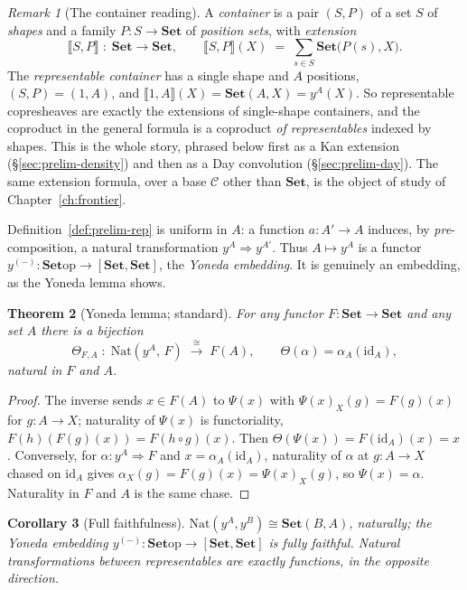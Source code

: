 \documentclass[11pt]{report}
\theoremstyle{plain}
\newtheorem{theorem}{Theorem}[chapter]
\newtheorem{corollary}[theorem]{Corollary}
\theoremstyle{definition}
\theoremstyle{remark}
\newtheorem{remark}[theorem]{Remark}
\newcommand{\Nat}{\mathrm{Nat}}
\newcommand{\op}{\mathrm{op}}
\newcommand{\Set}{\mathbf{Set}}
\newcommand{\den}[1]{\llbracket #1 \rrbracket}
\newcommand{\yA}{y^{A}}
\newcommand{\yy}{y^{(-)}}
\newcommand{\id}{\mathrm{id}}
\newcommand{\iso}{\cong}
\begin{document}
\begin{remark}[The container reading]
\label{rem:prelim-containerrep}
A \emph{container} is a pair $(S,P)$ of a set $S$ of \emph{shapes} and a family
$P\colon S\to\Set$ of \emph{position sets}, with \emph{extension}
\[
  \den{S,P}\;:\;\Set\to\Set,
  \qquad
  \den{S,P}(X) \;=\; \sum_{s\in S}\Set\!\bigl(P(s),X\bigr).
\]
The \emph{representable container} has a single shape and $A$ positions,
$(S,P)=(1,A)$, and $\den{1,A}(X)=\Set(A,X)=\yA(X)$. So representable copresheaves
are exactly the extensions of single-shape containers, and the coproduct in the
general formula is a coproduct \emph{of representables} indexed by shapes. This is
the whole story, phrased below first as a Kan extension
(\S\ref{sec:prelim-density}) and then as a Day convolution
(\S\ref{sec:prelim-day}). The same extension formula, over a base $\mathcal C$
other than $\Set$, is the object of study of Chapter~\ref{ch:frontier}.
\end{remark}

Definition~\ref{def:prelim-rep} is uniform in $A$: a function $a\colon A'\to A$
induces, by \emph{pre}-composition, a natural transformation $\yA\Rightarrow
y^{A'}$. Thus $A\mapsto\yA$ is a functor $\yy\colon\Set\op\to[\Set,\Set]$, the
\emph{Yoneda embedding}. It is genuinely an embedding, as the Yoneda lemma shows.

\begin{theorem}[Yoneda lemma; standard]
\label{thm:prelim-yoneda}
For any functor $F\colon\Set\to\Set$ and any set $A$ there is a bijection
\[
  \Theta_{F,A}\;:\;\Nat(\yA,\,F)\;\xrightarrow{\ \iso\ }\;F(A),
  \qquad \Theta(\alpha)=\alpha_{A}(\id_{A}),
\]
natural in $F$ and $A$.
\end{theorem}

\begin{proof}
The inverse sends $x\in F(A)$ to $\Psi(x)$ with $\Psi(x)_{X}(g)=F(g)(x)$ for
$g\colon A\to X$; naturality of $\Psi(x)$ is functoriality,
$F(h)(F(g)(x))=F(h\circ g)(x)$. Then $\Theta(\Psi(x))=F(\id_A)(x)=x$. Conversely,
for $\alpha\colon\yA\Rightarrow F$ and $x=\alpha_A(\id_A)$, naturality of $\alpha$
at $g\colon A\to X$ chased on $\id_A$ gives $\alpha_X(g)=F(g)(x)=\Psi(x)_X(g)$, so
$\Psi(x)=\alpha$. Naturality in $F$ and $A$ is the same chase.
\end{proof}

\begin{corollary}[Full faithfulness]
\label{cor:prelim-ff}
$\Nat(\yA,y^{B})\iso\Set(B,A)$, naturally; the Yoneda embedding
$\yy\colon\Set\op\to[\Set,\Set]$ is fully faithful. Natural transformations
between representables are exactly functions, in the opposite direction.
\end{corollary}
\end{document}
